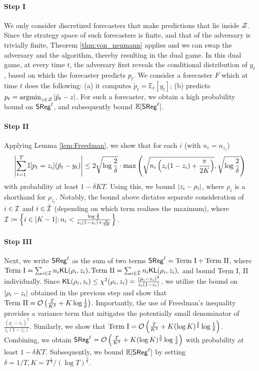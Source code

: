 \paragraph{Step I} We only consider discretized forecasters that make predictions that lie inside $\mathcal{Z}$. Since the strategy space of such forecasters is finite, and that of the adversary is trivially finite, Theorem \ref{thm:von_neumann} applies and we can swap the adversary and the algorithm, thereby resulting in the dual game. In this dual game, at every time $t$, the adversary first reveals the conditional distribution of $y_{t}$, based on which the forecaster predicts $p_{t}$. We consider a forecaster $F$ which at time $t$ does the following: (a) it computes $\tilde{p}_{t} = \mathbb{E}_{t}[y_{t}]$; (b) predicts $p_{t} = \operatorname*{argmin}_{z \in \mathcal{Z}} \left\lvert\tilde{p}_{t} - z\right\rvert$. For such a forecaster, we obtain a high probability bound on $\mathsf{SReg}^{\ell}$, and subsequently bound $\mathbb{E}[\mathsf{SReg}^{\ell}]$.

\paragraph{Step II} Applying Lemma \ref{lem:Freedman}, we show that for each $i$ (with $n_i = n_{z_i}$)
\begin{align*}
        \left\lvert\sum_{t = 1} ^ {T}\mathbb{I}{\left[p_{t} = z_{i}\right]} (\tilde{p}_{t} - y_{t})\right\rvert \le 2\sqrt{\log \frac{2}{\delta}} \cdot\max\left( \sqrt{n_{i}\left( z_{i}(1 - z_{i}) + \frac{\pi}{2K} \right)}, \sqrt{\log \frac{2}{\delta}} \right)
\end{align*}
with probability at least $1 - \delta KT$. Using this, we bound $\left\lvert z_{i} - \rho_{i}\right\rvert$, where $\rho_{i}$ is a shorthand for $\rho_{z_{i}}$. Notably, the bound above dictates separate consideration of $i \in \mathcal{I}$ and $i \in \bar{\mathcal{I}}$ (depending on which term realizes the maximum), where $\mathcal{I} \coloneqq \left\{ i \in [K - 1]; n_{i} < \frac{\log \frac{2}{\delta}}{z_{i}(1 - z_{i}) + \frac{\pi}{2K}} \right\}$.

\paragraph{Step III} Next, we write $\mathsf{SReg}^{\ell}$ as  the sum of two terms $\mathsf{SReg}^{\ell} = \text{Term I} + \text{Term II}$, where $\text{Term I} = \sum_{i \in \mathcal{I}} n_{i} \mathsf{KL}(\rho_{i}, z_{i}), \text{Term II} = {\sum_{i \in \bar{\mathcal{I}}} n_{i} \mathsf{KL}(\rho_{i}, z_{i})},$ and bound Term I, II individually. Since $\mathsf{KL}(\rho_{i}, z_{i}) \le \chi^{2}(\rho_{i}, z_{i}) = \frac{(\rho_{i} - z_{i}) ^ {2}}{z_{i}(1 - z_{i})}$, we utilize the bound on $\left\lvert\rho_{i} - z_{i}\right\rvert$ obtained in the previous step and show that $\text{Term II} = \mathcal{O}\left( \frac{T}{K ^ {2}} + K \log \frac{1}{\delta} \right)$.
Importantly, the use of Freedman's inequality provides a variance term that mitigates the potentially small denominator of $\frac{(\rho_{i} - z_{i}) ^ {2}}{z_{i}(1 - z_{i})}$.
Similarly, we show that $\text{Term I} = \mathcal{O}\left( \frac{T}{K ^ {2}} + K (\log K)^{\frac{3}{2}}  \log \frac{1}{\delta} \right)$. Combining, we obtain $\mathsf{SReg}^{\ell} = \mathcal{O}\left( \frac{T}{K ^ {2}} + K (\log K) ^ {\frac{3}{2}} \log \frac{1}{\delta} \right)$ with probability at least $1 - \delta KT$. Subsequently, we bound $\mathbb{E}[\mathsf{SReg}^{\ell}]$ by setting $\delta = 1/T, K = T^{\frac{1}{3}}/{(\log T) ^ {\frac{5}{6}}}$.

